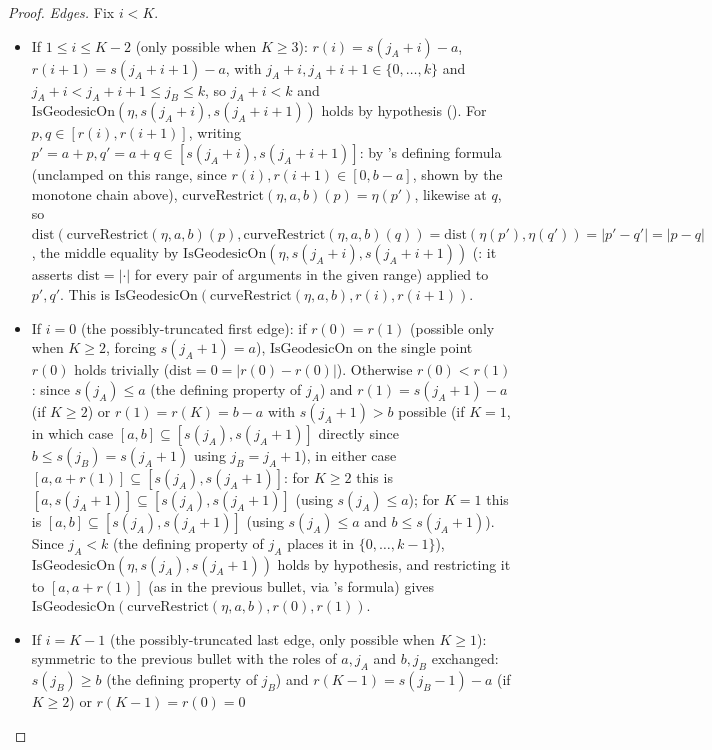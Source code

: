\begin{proof}
  \emph{Edges.} Fix $i<K$.
  \begin{itemize}
    \item If $1 \le i \le K-2$ (only possible when $K\ge3$): $r(i)=s(j_A+i)-a$, $r(i+1)=s(j_A+i+1)-a$,
      with $j_A+i, j_A+i+1 \in \{0,\dots,k\}$ and $j_A+i < j_A+i+1 \le j_B \le k$, so $j_A+i<k$ and
      $\mathrm{IsGeodesicOn}(\eta,s(j_A+i),s(j_A+i+1))$ holds by hypothesis
      (). For $p,q \in [r(i),r(i+1)]$, writing $p'=a+p,q'=a+q \in
      [s(j_A+i),s(j_A+i+1)]$: by 's defining formula (unclamped on this
      range, since $r(i),r(i+1)\in[0,b-a]$, shown by the monotone chain above),
      $\mathrm{curveRestrict}(\eta,a,b)(p)=\eta(p')$, likewise at $q$, so
      $\mathrm{dist}(\mathrm{curveRestrict}(\eta,a,b)(p),\mathrm{curveRestrict}(\eta,a,b)(q)) =
      \mathrm{dist}(\eta(p'),\eta(q')) = |p'-q'|=|p-q|$, the middle equality by
      $\mathrm{IsGeodesicOn}(\eta,s(j_A+i),s(j_A+i+1))$ (: it asserts
      $\mathrm{dist}=|\cdot|$ for every pair of arguments in the given range) applied to $p',q'$.
      This is $\mathrm{IsGeodesicOn}(\mathrm{curveRestrict}(\eta,a,b),r(i),r(i+1))$.
    \item If $i=0$ (the possibly-truncated first edge): if $r(0)=r(1)$ (possible only when $K\ge2$,
      forcing $s(j_A+1)=a$), $\mathrm{IsGeodesicOn}$ on the single point $r(0)$ holds trivially
      ($\mathrm{dist}=0=|r(0)-r(0)|$).
      Otherwise $r(0)<r(1)$: since $s(j_A)\le a$ (the defining property of $j_A$) and
      $r(1)=s(j_A+1)-a$ (if $K\ge2$) or $r(1)=r(K)=b-a$ with $s(j_A+1)>b$ possible (if $K=1$, in
      which case $[a,b] \subseteq [s(j_A),s(j_A+1)]$ directly since $b\le s(j_B)=s(j_A+1)$ using
      $j_B=j_A+1$), in either case $[a,a+r(1)] \subseteq [s(j_A),s(j_A+1)]$: for $K\ge2$ this is
      $[a,s(j_A+1)]\subseteq [s(j_A),s(j_A+1)]$ (using $s(j_A)\le a$); for $K=1$ this is
      $[a,b]\subseteq[s(j_A),s(j_A+1)]$ (using $s(j_A)\le a$ and $b \le s(j_A+1)$). Since $j_A<k$
      (the defining property of $j_A$ places it in $\{0,\dots,k-1\}$),
      $\mathrm{IsGeodesicOn}(\eta,s(j_A),s(j_A+1))$ holds by hypothesis, and restricting it to
      $[a,a+r(1)]$ (as in the previous bullet, via 's formula) gives
      $\mathrm{IsGeodesicOn}(\mathrm{curveRestrict}(\eta,a,b),r(0),r(1))$.
    \item If $i=K-1$ (the possibly-truncated last edge, only possible when $K\ge1$): symmetric to
      the previous bullet with the roles of $a,j_A$ and $b,j_B$ exchanged: $s(j_B)\ge b$
      (the defining property of $j_B$) and $r(K-1) = s(j_B-1)-a$ (if $K\ge2$) or $r(K-1)=r(0)=0$

\end{itemize}
\end{proof}
